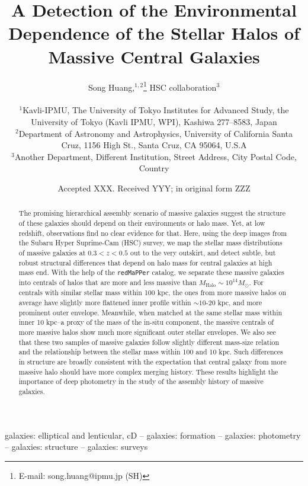 \documentclass[a4paper,fleqn,usenatbib]{mnras}
\title[Structure and Halo of Massive Galaxies]{A Detection of the Environmental 
       Dependence of the Stellar Halos of Massive Central Galaxies}
\author[S. Huang et al.]{
        Song Huang,$^{1,2}$\thanks{E-mail: song.huang@ipmu.jp (SH)}
        HSC collaboration$^{3}$   
        \\ \\
        $^{1}$Kavli-IPMU, The University of Tokyo Institutes for Advanced Study, 
              the University of Tokyo (Kavli IPMU, WPI), Kashiwa 277--8583, Japan\\
        $^{2}$Department of Astronomy and Astrophysics, University of California 
              Santa Cruz, 1156 High St., Santa Cruz, CA 95064, U.S.A\\
        $^{3}$Another Department, Different Institution, Street Address, City Postal 
              Code, Country
        }
\date{Accepted XXX. Received YYY; in original form ZZZ}
\def\redm{\texttt{redMaPPer}}
\begin{document}
\label{firstpage}
\pagerange{\pageref{firstpage}--\pageref{lastpage}}

\maketitle


\begin{abstract}
    
    The promising hierarchical assembly scenario of massive galaxies suggest the 
    structure of these galaxies should depend on their environments or halo mass.
    Yet, at low redshift, observations find no clear evidence for that. 
    Here, using the deep images from the Subaru Hyper Suprime-Cam (HSC) survey,
    we map the stellar mass distributions of massive galaxies at $0.3 < z < 0.5$ 
    out to the very outskirt, and detect subtle, but robust structural differences 
    that depend on halo mass for central galaxies at high mass end. 
    With the help of the \redm{} catalog, we separate these massive galaxies 
    into centrals of halos that are more and less massive than 
    $M_{\mathrm{Halo}}\sim 10^{14} M_{\odot}$.
    For centrals with similar stellar mass within 100 kpc, the ones from 
    more massive halos on average have slightly more flattened inner profile 
    within $\sim 10$-$20$ kpc, and more prominent outer envelope.
    Meanwhile, when matched at the same stellar mass within inner 10 kpc--a 
    proxy of the mass of the in-situ component, the massive centrals of more  
    massive halos show much more significant outer stellar envelopes.    
    We also see that these two samples of massive galaxies follow slightly 
    different mass-size relation and the relationship between the stellar mass 
    within 100 and 10 kpc.
    Such differences in structure are broadly consistent with the expectation that
    central galaxy from more massive halo should have more complex merging history.
    These results highlight the importance of deep photometry in the study of 
    the assembly history of massive galaxies.  

\end{abstract}

\begin{keywords}
    galaxies: elliptical and lenticular, cD --
    galaxies: formation --
    galaxies: photometry -- 
    galaxies: structure -- 
    galaxies: surveys
\end{keywords}
\end{document}
